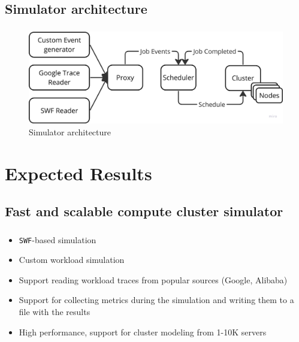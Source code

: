 \documentclass[t]{beamer}  %
\begin{document}
	\subsection{Simulator architecture}

	\begin{frame}[fragile]
		\frametitle{\insertsection} 
		\framesubtitle{\insertsubsection}
		
		\vspace{0.5cm}
\begin{figure}[H]
	\includegraphics[width=\linewidth]{images/simulator_arc}
	\caption*{Simulator architecture}
\end{figure}

	\end{frame}

	\section{Expected Results}
	\subsection{Fast and scalable compute cluster simulator}
	\begin{frame}[fragile]
		\frametitle{\insertsection} 
		\framesubtitle{\insertsubsection}
		\vspace{1cm}
		\begin{itemize}
			\item[\ding{51}] \texttt{SWF}-based simulation 
			\item Custom workload simulation
			\item Support reading workload traces from popular sources (Google, Alibaba)
			\item Support for collecting metrics during the simulation and writing them to a file with the results
			\item High performance, support for cluster modeling from 1-10K servers
		\end{itemize}

	\end{frame}
\end{document}
